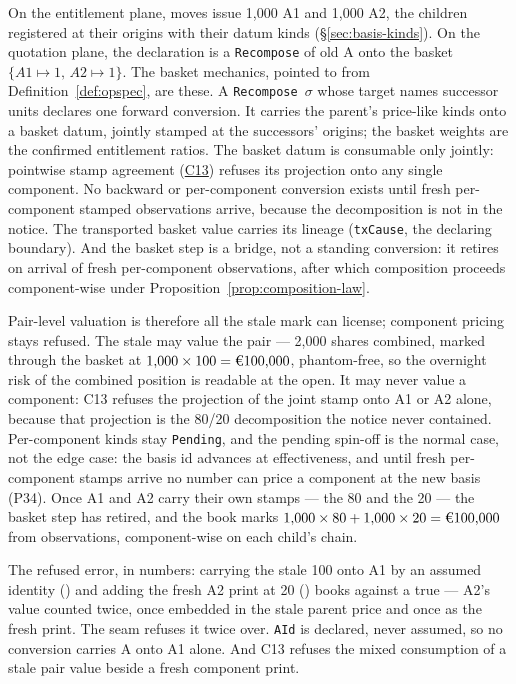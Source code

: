 On the entitlement plane, moves issue 1{,}000 A1 and 1{,}000 A2, the children
registered at their origins with their datum kinds (\S\ref{sec:basis-kinds}).
On the quotation plane, the declaration is a \texttt{Recompose} of old A onto
the basket $\{A1\mapsto1,\,A2\mapsto1\}$. The basket mechanics, pointed to
from Definition~\ref{def:opspec}, are these. A \texttt{Recompose}~$\sigma$
whose target names successor units declares one forward conversion. It
carries the parent's price-like kinds onto a basket datum, jointly stamped at
the successors' origins; the basket weights are the confirmed entitlement
ratios. The basket datum is consumable only jointly: pointwise stamp agreement
(\hyperref[cond:C13]{C13}) refuses its projection onto any single component.
No backward or per-component conversion exists until fresh per-component
stamped observations arrive, because the decomposition is not in the notice.
The transported basket value carries its lineage (\texttt{txCause}, the
declaring boundary). And the basket step is a bridge, not a standing
conversion: it retires on arrival of fresh per-component observations, after
which composition proceeds component-wise under
Proposition~\ref{prop:composition-law}.

Pair-level valuation is therefore all the stale  mark can license;
component pricing stays refused. The stale  may value the pair --- 2{,}000
shares combined, marked through the basket at
$1{,}000\times100=\EUR{100{,}000}$, phantom-free, so the overnight risk of
the combined position is readable at the open. It may never value a
component: C13 refuses the projection of the joint stamp onto A1 or A2 alone,
because that projection is the 80/20 decomposition the notice never
contained. Per-component kinds stay \texttt{Pending}, and the pending
spin-off is the normal case, not the edge case: the basis id advances at
effectiveness, and until fresh per-component stamps arrive no number can
price a component at the new basis (P34). Once A1 and A2 carry their own
stamps --- the 80 and the 20 --- the basket step has retired, and the book
marks $1{,}000\times80+1{,}000\times20=\EUR{100{,}000}$ from observations,
component-wise on each child's chain.

The refused error, in numbers: carrying the stale 100 onto A1 by an assumed
identity () and adding the fresh A2 print at 20
() books  against a true  ---
A2's value counted twice, once embedded in the stale parent price and once as
the fresh print. The seam refuses it twice over. \texttt{AId} is declared,
never assumed, so no conversion carries A onto A1 alone. And C13 refuses the
mixed consumption of a stale pair value beside a fresh component print.

